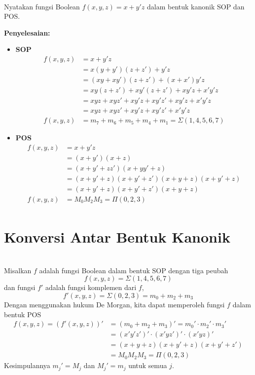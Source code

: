 \documentclass[11pt]{article}
\theoremstyle{definitionstyle}
\theoremstyle{theoremstyle}
\theoremstyle{examplestyle}
\begin{document}
\begin{example} \hfill \\
    Nyatakan fungsi Boolean $f(x, y, z) = x + y'z$ dalam bentuk kanonik SOP dan POS. \\
\end{example}
\pagebreak
\textbf{Penyelesaian:}
\begin{itemize}[left=0pt, itemsep=1.5pt, topsep=1.5pt]
    \item \textbf{SOP} 
    \begin{align*}
        f(x, y, z) &= x + y'z \\
        &= x(y + y')(z + z') + y'z\\
        &= (xy + xy')(z + z') + (x + x')y'z\\
        &= xy(z + z') + xy'(z + z') + xy'z + x'y'z \\
        &= xyz + xyz' + xy'z + xy'z' + xy'z + x'y'z \\
        &= xyz + xyz' + xy'z + xy'z' + x'y'z \\
        f(x, y, z) &= m_7 + m_6 + m_5 + m_4 + m_1 = \Sigma(1, 4, 5, 6, 7)
    \end{align*}
    \item \textbf{POS} \\
    \begin{align*}
        f(x, y, z) &= x + y'z \\
        &= (x + y')(x + z) \\
        &= (x + y' + zz')(x + yy' + z) \\
        &= (x + y' + z)(x + y' + z')(x + y + z)(x + y' + z) \\
        &= (x + y' + z)(x + y' + z')(x + y + z)\\
        f(x, y, z) &= M_0M_2M_3 = \Pi(0, 2, 3) \\  
    \end{align*}
\end{itemize}

\section{Konversi Antar Bentuk Kanonik} \hfill \\
Misalkan $f$ adalah fungsi Boolean dalam bentuk SOP dengan tiga peubah 
$$f(x, y, z) = \Sigma(1, 4, 5, 6, 7)$$ dan fungsi $f'$ adalah fungsi komplemen dari $f$,
$$f'(x, y, z) = \Sigma(0, 2, 3) = m_0 + m _2 + m_3$$
Dengan menggunakan hukum De Morgan, kita dapat memperoleh fungsi $f$ dalam bentuk POS
\begin{align*}
    f(x, y, z) = (f'(x, y, z))' &= (m_0 + m_2 + m_3)' = m_0' \cdot m_2' \cdot m_3' \\
    &= (x'y'z')' \cdot (x'yz')' \cdot (x'yz)' \\
    &= (x + y + z)(x + y' + z)(x + y' + z') \\
    &= M_0M_2M_3 = \Pi(0, 2, 3)
\end{align*}
Kesimpulannya $m_j' = M_j$ dan $M_j' = m_j$ untuk semua $j$. \\
\end{document}

